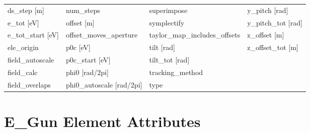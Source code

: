 \begin{tabular}{llll}
ds_step [m]                      & num_steps                        & superimpose                      & y_pitch [rad]                    \\
e_tot [eV]                       & offset [m]                       & symplectify                      & y_pitch_tot [rad]                \\
e_tot_start [eV]                 & offset_moves_aperture            & taylor_map_includes_offsets      & z_offset [m]                     \\
ele_origin                       & p0c [eV]                         & tilt [rad]                       & z_offset_tot [m]                 \\
field_autoscale                  & p0c_start [eV]                   & tilt_tot [rad]                   &                                  \\
field_calc                       & phi0 [rad/2pi]                   & tracking_method                  &                                  \\
field_overlaps                   & phi0_autoscale [rad/2pi]         & type                             &                                  \\
 \bottomrule
 \end{tabular}
 \vfill
 
 \section{E_Gun Element Attributes}
 \label{s:list.e.gun}
 
